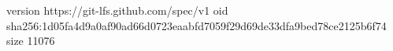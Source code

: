 version https://git-lfs.github.com/spec/v1
oid sha256:1d05fa4d9a0af90ad66d0723eaabfd7059f29d69de33dfa9bed78ce2125b6f74
size 11076
